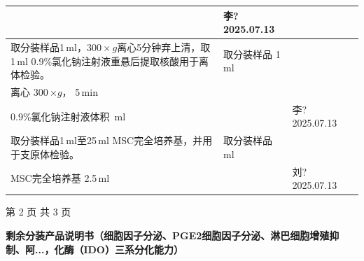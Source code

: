 \documentclass[UTF8,10pt,a4paper,fontset=fandol]{ctexart}
\newcommand{\fieldvalue}[1]{#1}
\newcommand{\handwritten}[1]{#1}
\begin{document}
\begin{tabularx}{\textwidth}{|p{}|X|p{}|p{}|}
\multicolumn{1}{l|}{} &
\fieldvalue{\handwritten{李?\,2025.07.13}} \\
\hline
取分装样品1\,ml，$300\times g$离心5分钟弃上清，取1\,ml 0.9\%氯化钠注射液重悬后提取核酸用于离体检验。 &
取分装样品
\fieldvalue{\handwritten{1}}\,ml\\
离心
\fieldvalue{\handwritten{300}}\,$\times g$，
\fieldvalue{\handwritten{5}}\,min\\
0.9\%氯化钠注射液体积
\underline{\hspace{1.2cm}}\,ml &
\multicolumn{1}{l|}{} &
\fieldvalue{\handwritten{李?\,2025.07.13}} \\
\hline
取分装样品1\,ml至25\,ml MSC完全培养基，并用于支原体检验。 &
取分装样品
\underline{\hspace{1.2cm}}\,ml\\
MSC完全培养基
\fieldvalue{\handwritten{2.5}}\,ml &
\multicolumn{1}{l|}{} &
\fieldvalue{\handwritten{刘?\,2025.07.13}} \\
\hline
\end{tabularx}

\vfill
\begin{center}
第 2 页 共 3 页
\end{center}

\newpage

\begin{center}
\textbf{剩余分装产品说明书（细胞因子分泌、PGE2细胞因子分泌、淋巴细胞增殖抑制、阿...，化酶（IDO）三系分化能力）}
\end{center}
\end{document}
